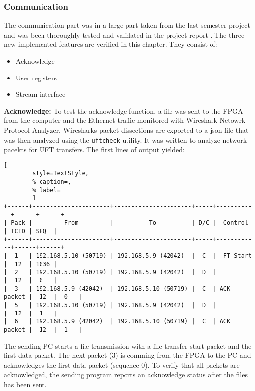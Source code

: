 \subsubsection*{Communication}
The communication part was in a large part taken from the last semester project
and was been thoroughly tested and validated in the project report 
\cite{p5report}. The three new implemented features are verified in this
chapter. They consist of:
\begin{itemize}
    \item Acknowledge
    \item User registers
    \item Stream interface
\end{itemize}

\vspace{1ex}
\textbf{Acknowledge:} To test the acknowledge function, a file was sent to the
FPGA from the computer
and the Ethernet traffic monitored with Wireshark Netowrk Protocol Analyzer.
Wiresharks packet dissections are exported to a json file that was then analyzed
using the \texttt{uftcheck} utility. It was written to analyze network pacekts
for UFT transfers. The first lines of output yielded:

\vspace{1ex}
\begin{minipage}{1\linewidth}
    \begin{lstlisting}[
        style=TextStyle, 
        % caption=, 
        % label=
        ]
+------+----------------------+----------------------+-----+------------+------+------+
| Pack |         From         |          To          | D/C |  Control   | TCID | SEQ  | 
+------+----------------------+----------------------+-----+------------+------+------+
|  1   | 192.168.5.10 (50719) | 192.168.5.9 (42042)  |  C  |  FT Start  |  12  | 1036 |
|  2   | 192.168.5.10 (50719) | 192.168.5.9 (42042)  |  D  |            |  12  |  0   |
|  3   | 192.168.5.9 (42042)  | 192.168.5.10 (50719) |  C  | ACK packet |  12  |  0   |
|  5   | 192.168.5.10 (50719) | 192.168.5.9 (42042)  |  D  |            |  12  |  1   |
|  6   | 192.168.5.9 (42042)  | 192.168.5.10 (50719) |  C  | ACK packet |  12  |  1   |
\end{lstlisting}
\end{minipage}

\vspace{1ex}
The sending PC starts a file transmission with a file transfer start packet and
the first data packet. The next packet (3) is comming from the FPGA to the PC
and acknowledges the first data packet (sequence 0). To verify that all packets
are acknowledged, the sending program reports an acknowledge status after the
files has been sent. 

